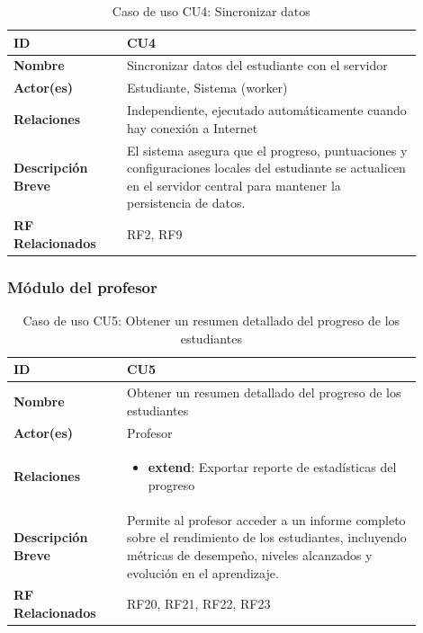 \begin{table}[H]
\centering
\begin{tabular}{|p{0.25\linewidth}|p{0.65\linewidth}|}
\hline
\textbf{ID} & CU4 \\
\hline
\textbf{Nombre} & Sincronizar datos del estudiante con el servidor \\
\hline
\textbf{Actor(es)} & Estudiante, Sistema (worker) \\
\hline
\textbf{Relaciones} & Independiente, ejecutado automáticamente cuando hay conexión a Internet \\
\hline
\textbf{Descripción Breve} & El sistema asegura que el progreso, puntuaciones y configuraciones locales del estudiante se actualicen en el servidor central para mantener la persistencia de datos. \\
\hline
\textbf{RF Relacionados} & RF2, RF9 \\
\hline
\end{tabular}
\caption{Caso de uso CU4: Sincronizar datos}
\end{table}


\subsubsection*{Módulo del profesor}

\begin{table}[H]
\centering
\begin{tabular}{|p{0.25\linewidth}|p{0.65\linewidth}|}
\hline
\textbf{ID} & CU5 \\
\hline
\textbf{Nombre} & Obtener un resumen detallado del progreso de los estudiantes \\
\hline
\textbf{Actor(es)} & Profesor \\
\hline
\textbf{Relaciones} & 
\begin{itemize}
    \item \textbf{extend}: Exportar reporte de estadísticas del progreso
\end{itemize} \\
\hline
\textbf{Descripción Breve} & Permite al profesor acceder a un informe completo sobre el rendimiento de los estudiantes, incluyendo métricas de desempeño, niveles alcanzados y evolución en el aprendizaje. \\
\hline
\textbf{RF Relacionados} & RF20, RF21, RF22, RF23 \\
\hline
\end{tabular}
\caption{Caso de uso CU5: Obtener un resumen detallado del progreso de los estudiantes}
\end{table}

